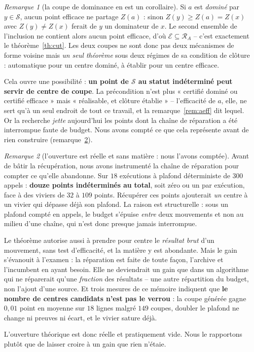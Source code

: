 \documentclass[11pt,a4paper]{article}
\theoremstyle{plain}
\theoremstyle{remark}
\newtheorem{remark}{Remarque}
\newcommand{\Ecal}{\mathcal{E}}
\newcommand{\Scal}{\mathcal{S}}
\newcommand{\Rcal}{\mathcal{R}}
\begin{document}
\begin{remark}[la coupe de dominance en est un corollaire]
\label{rem:unification}
Si $a$ est \emph{dominé} par $y\in\Scal$, aucun point efficace ne partage
$Z(a)$ : sinon $Z(y)\ge Z(a)=Z(x)$ avec $Z(y)\ne Z(x)$ ferait de $y$ un
dominateur de $x$. Le second ensemble de l'inclusion ne contient alors aucun
point efficace, d'où $\Ecal\subseteq\Rcal_A$ -- c'est exactement le
théorème~\ref{th:cut}. Les deux coupes ne sont donc pas deux mécanismes de
forme voisine mais \emph{un seul théorème} sous deux régimes de sa condition
de clôture : automatique pour un centre dominé, à établir pour un centre
efficace.

Cela ouvre une possibilité : \textbf{un point de $\Scal$ au statut
indéterminé peut servir de centre de coupe}. La précondition n'est plus
« certifié dominé ou certifié efficace » mais « réalisable, et clôture
établie » -- l'efficacité de $a$, elle, ne sert qu'à un seul endroit de tout
ce travail, et la remarque~\ref{rem:aeff} dit lequel. Or la recherche
\emph{jette} aujourd'hui les points dont la
chaîne de réparation a été interrompue faute de budget. Nous avons compté
ce que cela représente avant de rien construire
(remarque~\ref{rem:indetermines}).
\end{remark}

\begin{remark}[l'ouverture est réelle et sans matière : nous l'avons
comptée]\label{rem:indetermines}
Avant de bâtir la récupération, nous avons instrumenté la chaîne de
réparation pour compter ce qu'elle abandonne. Sur $18$ exécutions à plafond
déterministe de $300$ appels : \textbf{douze points indéterminés au total},
soit zéro ou un par exécution, face à des viviers de $32$ à $109$ points.
Récupérer ces points ajouterait \emph{un} centre à un vivier qui dépasse
déjà son plafond. La raison est structurelle : sous un plafond compté en
appels, le budget s'épuise \emph{entre} deux mouvements et non au milieu
d'une chaîne, qui n'est donc presque jamais interrompue.

Le théorème autorise aussi à prendre pour centre le \emph{résultat brut}
d'un mouvement, sans test d'efficacité, et la matière y est abondante. Mais
le gain s'évanouit à l'examen : la réparation est faite de toute façon,
l'archive et l'incumbent en ayant besoin. Elle ne deviendrait un gain que
dans un algorithme qui ne réparerait qu'une \emph{fraction} des résultats --
une autre répartition du budget, non l'ajout d'une source. Et trois mesures
de ce mémoire indiquent que \textbf{le nombre de centres candidats n'est pas
le verrou} : la coupe générée gagne $0{,}01$ point en moyenne sur $18$
lignes malgré $149$ coupes, doubler le plafond ne change ni preuves ni
écart, et le vivier sature déjà.

L'ouverture théorique est donc réelle et pratiquement vide. Nous le
rapportons plutôt que de laisser croire à un gain que rien n'étaie.
\end{remark}
\end{document}

